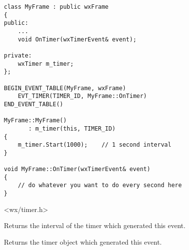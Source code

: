 \begin{verbatim}
class MyFrame : public wxFrame
{
public:
    ...
    void OnTimer(wxTimerEvent& event);

private:
    wxTimer m_timer;
};

BEGIN_EVENT_TABLE(MyFrame, wxFrame)
    EVT_TIMER(TIMER_ID, MyFrame::OnTimer)
END_EVENT_TABLE()

MyFrame::MyFrame()
       : m_timer(this, TIMER_ID)
{
    m_timer.Start(1000);    // 1 second interval
}

void MyFrame::OnTimer(wxTimerEvent& event)
{
    // do whatever you want to do every second here
}

\end{verbatim}




<wx/timer.h>




\label{wxtimereventgetinterval}


Returns the interval of the timer which generated this event.


\label{wxtimereventgettimer}


Returns the timer object which generated this event.

